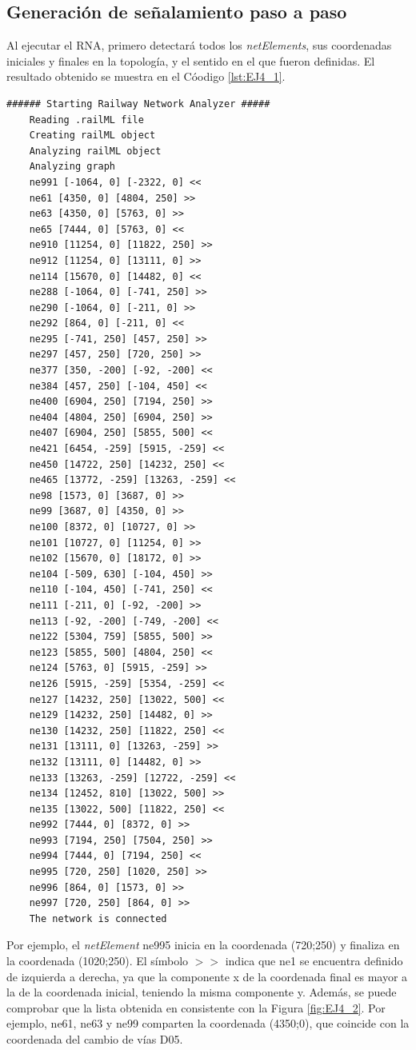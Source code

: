 \subsection{Generación de señalamiento paso a paso}

Al ejecutar el RNA, primero detectará todos los \textit{netElements}, sus coordenadas iniciales y finales en la topología, y el sentido en el que fueron definidas. El resultado obtenido se muestra en el Cóodigo \ref{lst:EJ4_1}.

\begin{lstlisting}[language = {}, tabsize=4, basicstyle=\footnotesize\ttfamily, showspaces=false, showstringspaces=false, caption = Detección de \textit{netElements} por parte del RNA , label = {lst:EJ41_1}]
	###### Starting Railway Network Analyzer #####
	Reading .railML file
	Creating railML object
	Analyzing railML object
	Analyzing graph
	ne991 [-1064, 0] [-2322, 0] <<
	ne61 [4350, 0] [4804, 250] >> 
	ne63 [4350, 0] [5763, 0] >>
	ne65 [7444, 0] [5763, 0] <<
	ne910 [11254, 0] [11822, 250] >>
	ne912 [11254, 0] [13111, 0] >>
	ne114 [15670, 0] [14482, 0] <<
	ne288 [-1064, 0] [-741, 250] >>
	ne290 [-1064, 0] [-211, 0] >>
	ne292 [864, 0] [-211, 0] <<
	ne295 [-741, 250] [457, 250] >>
	ne297 [457, 250] [720, 250] >>
	ne377 [350, -200] [-92, -200] <<
	ne384 [457, 250] [-104, 450] <<
	ne400 [6904, 250] [7194, 250] >>
	ne404 [4804, 250] [6904, 250] >>
	ne407 [6904, 250] [5855, 500] <<
	ne421 [6454, -259] [5915, -259] <<
	ne450 [14722, 250] [14232, 250] <<
	ne465 [13772, -259] [13263, -259] <<
	ne98 [1573, 0] [3687, 0] >>
	ne99 [3687, 0] [4350, 0] >>
	ne100 [8372, 0] [10727, 0] >>
	ne101 [10727, 0] [11254, 0] >>
	ne102 [15670, 0] [18172, 0] >>
	ne104 [-509, 630] [-104, 450] >>
	ne110 [-104, 450] [-741, 250] <<
	ne111 [-211, 0] [-92, -200] >>
	ne113 [-92, -200] [-749, -200] <<
	ne122 [5304, 759] [5855, 500] >>
	ne123 [5855, 500] [4804, 250] <<
	ne124 [5763, 0] [5915, -259] >>
	ne126 [5915, -259] [5354, -259] <<
	ne127 [14232, 250] [13022, 500] <<
	ne129 [14232, 250] [14482, 0] >>
	ne130 [14232, 250] [11822, 250] <<
	ne131 [13111, 0] [13263, -259] >>
	ne132 [13111, 0] [14482, 0] >>
	ne133 [13263, -259] [12722, -259] <<
	ne134 [12452, 810] [13022, 500] >>
	ne135 [13022, 500] [11822, 250] <<
	ne992 [7444, 0] [8372, 0] >>
	ne993 [7194, 250] [7504, 250] >>
	ne994 [7444, 0] [7194, 250] <<
	ne995 [720, 250] [1020, 250] >>
	ne996 [864, 0] [1573, 0] >>
	ne997 [720, 250] [864, 0] >>
	The network is connected
\end{lstlisting}

Por ejemplo, el \textit{netElement} ne995 inicia en la coordenada (720;250) y finaliza en la coordenada (1020;250). El símbolo $>>$ indica que ne1 se encuentra definido de izquierda a derecha, ya que la componente x de la coordenada final es mayor a la de la coordenada inicial, teniendo la misma componente y. Además, se puede comprobar que la lista obtenida en consistente con la Figura \ref{fig:EJ4_2}. Por ejemplo, ne61, ne63 y ne99 comparten la coordenada (4350;0), que coincide con la coordenada del cambio de vías D05.

